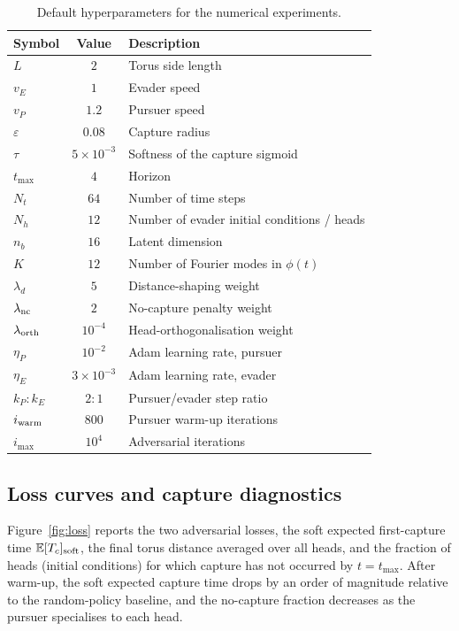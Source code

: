 \documentclass[11pt]{article}
\newcommand{\E}{\mathbb{E}}
\begin{document}
\begin{table}[h]
\centering
\caption{Default hyperparameters for the numerical experiments.}
\label{tab:hyperparams}
\begin{tabular}{lcl}
\toprule
Symbol & Value & Description \\
\midrule
$L$              & $2$       & Torus side length \\
$v_E$            & $1$       & Evader speed \\
$v_P$            & $1.2$     & Pursuer speed \\
$\varepsilon$    & $0.08$    & Capture radius \\
$\tau$           & $5\!\times\!10^{-3}$ & Softness of the capture sigmoid \\
$t_{\max}$       & $4$       & Horizon \\
$N_t$            & $64$      & Number of time steps \\
$N_h$            & $12$      & Number of evader initial conditions / heads \\
$n_b$            & $16$      & Latent dimension \\
$K$              & $12$      & Number of Fourier modes in $\phi(t)$ \\
$\lambda_d$      & $5$       & Distance-shaping weight \\
$\lambda_{\rm nc}$ & $2$     & No-capture penalty weight \\
$\lambda_{\rm orth}$ & $10^{-4}$ & Head-orthogonalisation weight \\
$\eta_P$         & $10^{-2}$ & Adam learning rate, pursuer \\
$\eta_E$         & $3\!\times\!10^{-3}$ & Adam learning rate, evader \\
$k_P\!:\!k_E$    & $2\!:\!1$ & Pursuer/evader step ratio \\
$i_{\rm warm}$   & $800$     & Pursuer warm-up iterations \\
$i_{\max}$       & $10^{4}$  & Adversarial iterations \\
\bottomrule
\end{tabular}
\end{table}

\subsection{Loss curves and capture diagnostics}
Figure~\ref{fig:loss} reports the two adversarial losses, the soft
expected first-capture time $\E[T_c]_{\rm soft}$, the final torus
distance averaged over all heads, and the fraction of heads (initial
conditions) for which capture has not occurred by $t=t_{\max}$.
After warm-up, the soft expected capture time drops by an order of
magnitude relative to the random-policy baseline, and the no-capture
fraction decreases as the pursuer specialises to each head.
\end{document}
